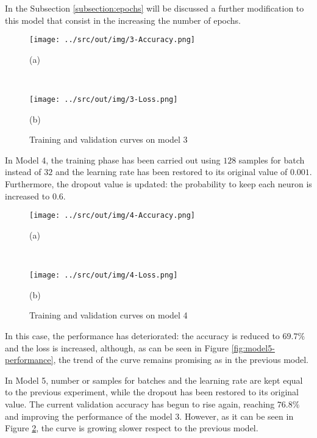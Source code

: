 \documentclass[a4paper,12pt]{article} %
\begin{document}
	In the Subsection \ref{subsection:epochs} will be discussed a further 
	modification to this model that consist in the increasing the number 
	of epochs.

	\begin{figure}[htb]
		\begin{minipage}[c]{.49\textwidth}
			\centering
			\texttt{[image: ../src/out/img/3-Accuracy.png]}
			\caption*{(a)}
		\end{minipage}
		~
		\begin{minipage}[c]{.49\textwidth}
			\centering
			\texttt{[image: ../src/out/img/3-Loss.png]}
			\caption*{(b)}
		\end{minipage}
		\caption{Training and validation curves on model 3}
		\label{fig:model3-performance}
	\end{figure}
	
	In Model 4, the training phase has been carried out using $128$ samples 
	for batch instead of $32$ and the learning rate has been restored to its 
	original value of $0.001$. 
	Furthermore, the dropout value is updated: the probability to keep each 
	neuron is increased to $0.6$. 
		
	\begin{figure}[htb]
		\begin{minipage}[c]{.49\textwidth}
			\centering
			\texttt{[image: ../src/out/img/4-Accuracy.png]}
			\caption*{(a)}
		\end{minipage}
		~
		\begin{minipage}[c]{.49\textwidth}
			\centering
			\texttt{[image: ../src/out/img/4-Loss.png]}
			\caption*{(b)}
		\end{minipage}
		\caption{Training and validation curves on model 4}
		\label{fig:model4-performance}
	\end{figure}

	In this case, the performance has deteriorated: the accuracy is reduced to 
	$69.7\%$ and the loss is increased, although, as can be seen in Figure 
	\ref*{fig:model5-performance}, the trend of the curve remains promising as 
	in the previous model.
	\newline
	
	In Model 5, number or samples for batches and the learning rate are kept 
	equal to the previous experiment, while the dropout has been restored to 
	its original value. 
	The current validation accuracy has begun to rise again, reaching $76.8\%$ 
	and improving the performance of the model 3. However, as it can be seen in 
	Figure \ref{fig:model4-performance}, the curve is growing slower respect to 
	the previous model.
	
\end{document}

